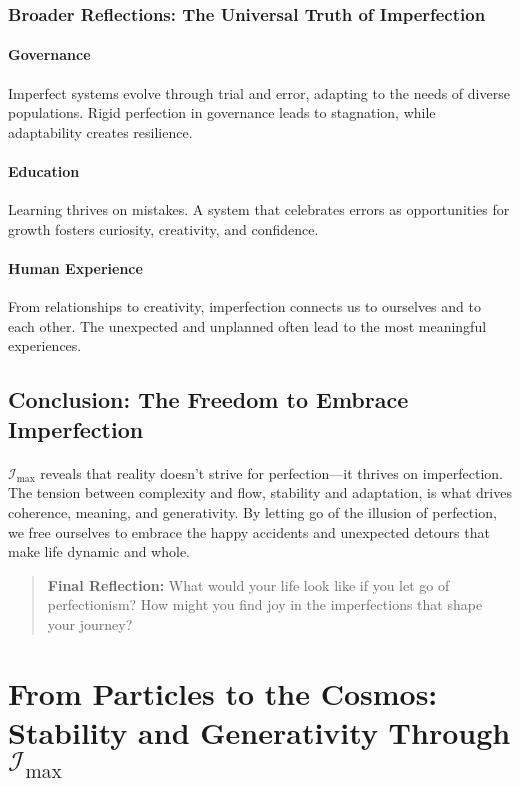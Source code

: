 \documentclass[12pt]{article}
\begin{document}
\subsubsection{Broader Reflections: The Universal Truth of Imperfection}

\paragraph{Governance} Imperfect systems evolve through trial and error, adapting to the needs of diverse populations. Rigid perfection in governance leads to stagnation, while adaptability creates resilience.

\paragraph{Education} Learning thrives on mistakes. A system that celebrates errors as opportunities for growth fosters curiosity, creativity, and confidence.

\paragraph{Human Experience} From relationships to creativity, imperfection connects us to ourselves and to each other. The unexpected and unplanned often lead to the most meaningful experiences.

\subsection{Conclusion: The Freedom to Embrace Imperfection}
\paragraph{}
\(\mathcal{I}_{\text{max}}\) reveals that reality doesn’t strive for perfection—it thrives on imperfection. The tension between complexity and flow, stability and adaptation, is what drives coherence, meaning, and generativity. By letting go of the illusion of perfection, we free ourselves to embrace the happy accidents and unexpected detours that make life dynamic and whole.

\begin{quote}
\textbf{Final Reflection:}  
What would your life look like if you let go of perfectionism? How might you find joy in the imperfections that shape your journey?
\end{quote}


\section{From Particles to the Cosmos: Stability and Generativity Through \(\mathcal{I}_{\text{max}}\)}
\end{document}
